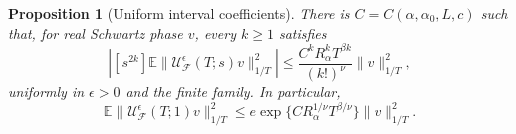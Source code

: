 \documentclass[12pt,oneside,openany]{book}
\makeatletter
\let\lean@pending\@empty
\newcommand{\LeanMarker}[1]{\gdef\lean@pending{#1}}
\numberwithin{equation}{section}
\newtheorem{proposition}[theorem]{Proposition}
\theoremstyle{nogostyle}
\theoremstyle{definition}
\newcommand{\E}{\mathbb{E}}
\makeatother
\begin{document}
\LeanMarker{P:interval-coefficients}
\begin{proposition}[Uniform interval coefficients]\label{P:interval-coefficients}
  There is $C = C(\alpha,\alpha_0,L,c)$ such that, for real Schwartz phase $v$,
  every $k \ge 1$ satisfies
  \begin{equation}\label{E:interval-coefficient-bound}
    \left|[s^{2k}]\E\|\mathcal{U}_{\mathcal{F}}^\epsilon(T;s)v\|_{1/T}^2\right|
    \le\frac{C^k R_\alpha^k T^{\beta k}}{(k!)^\nu}\|v\|_{1/T}^2,
  \end{equation}
  uniformly in $\epsilon > 0$ and the finite family. In particular,
  \begin{equation}\label{E:interval-phase-bound}
    \E\|\mathcal{U}_{\mathcal{F}}^\epsilon(T;1)v\|_{1/T}^2
    \le e\exp\{C R_\alpha^{1/\nu}T^{\beta/\nu}\}\|v\|_{1/T}^2.
  \end{equation}
\end{proposition}
\end{document}

